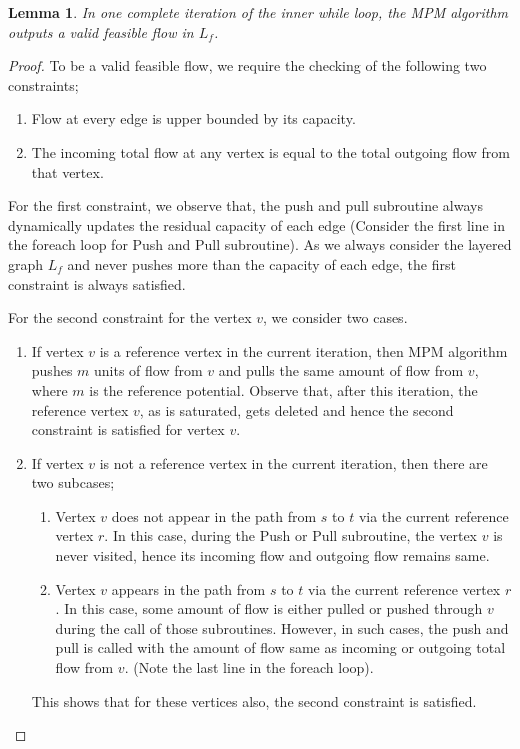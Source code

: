 \documentclass[12pt]{article}
\newtheorem{lemma}{Lemma}[section]
\begin{document}
\begin{lemma}
	In one complete iteration of the inner while loop, the MPM algorithm outputs a valid feasible flow in $L_f$.
\end{lemma}
\begin{proof}
	To be a valid feasible flow, we require the checking of the following two constraints;
	\begin{enumerate}
		\item Flow at every edge is upper bounded by its capacity.
		\item The incoming total flow at any vertex is equal to the total outgoing flow from that vertex.
	\end{enumerate}
	For the first constraint, we observe that, the push and pull subroutine always dynamically updates the residual capacity of each edge (Consider the first line in the foreach loop for Push and Pull subroutine). As we always consider the layered graph $L_f$ and never pushes more than the capacity of each edge, the first constraint is always satisfied.\par 
	For the second constraint for the vertex $v$, we consider two cases.
	\begin{enumerate}
		\item If vertex $v$ is a reference vertex in the current iteration, then MPM algorithm pushes $m$ units of flow from $v$ and pulls the same amount of flow from $v$, where $m$ is the reference potential. Observe that, after this iteration, the reference vertex $v$, as is saturated, gets deleted and hence the second constraint is satisfied for vertex $v$.
		\item If vertex $v$ is not a reference vertex in the current iteration, then there are two subcases;
		\begin{enumerate}
			\item Vertex $v$ does not appear in the path from $s$ to $t$ via the current reference vertex $r$. In this case, during the Push or Pull subroutine, the vertex $v$ is never visited, hence its incoming flow and outgoing flow remains same.
			\item Vertex $v$ appears in the path from $s$ to $t$ via the current reference vertex $r$. In this case, some amount of flow is either pulled or pushed through $v$ during the call of those subroutines. However, in such cases, the push and pull is called with the amount of flow same as incoming or outgoing total flow from $v$. (Note the last line in the foreach loop).
		\end{enumerate}
		This shows that for these vertices also, the second constraint is satisfied.
	\end{enumerate} 
\end{proof}
\end{document}
